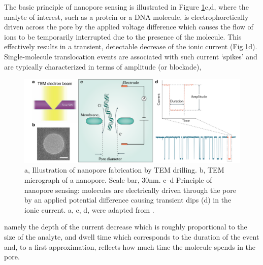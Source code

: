 The basic principle of nanopore sensing is illustrated in Figure \ref{fig:fig1.6}c,d, where the analyte of interest, such as a protein or a DNA molecule, is electrophoretically driven across the pore by the applied voltage difference which causes the flow of ions to be temporarily interrupted due to the presence of the molecule. This effectively results in a transient, detectable decrease of the ionic current (Fig.\ref{fig:fig1.6}d). Single-molecule translocation events are associated with such current ‘spikes’ and are typically characterized in terms of amplitude (or blockade), 
\begin{figure}[!htbp]
	\centering
	\includegraphics[width=1\linewidth]{figures/Figure1.6.pdf}
	\caption{a, Illustration of nanopore fabrication by TEM drilling. b, TEM micrograph of a nanopore. Scale bar, 30nm. c–d Principle of nanopore sensing: molecules are electrically driven through the pore by an applied potential difference causing transient dips (d) in the ionic current. a, c, d, were adapted from \cite{Xue2020}.}
	\label{fig:fig1.6}
\end{figure}
namely the depth of the current decrease which is roughly proportional to the size of the analyte, and dwell time which corresponds to the duration of the event and, to a first approximation, reflects how much time the molecule spends in the pore.

